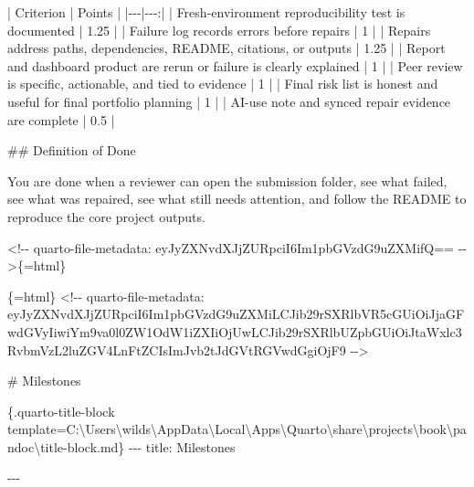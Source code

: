 \documentclass[
  letterpaper,
  DIV=11,
  numbers=noendperiod,
  oneside]{scrreprt}
\newenvironment{Shaded}{\begin{snugshade}}{\end{snugshade}}
\newcommand{\FunctionTok}[1]{\textcolor[rgb]{0.28,0.35,0.67}{#1}}
\newcommand{\InformationTok}[1]{\textcolor[rgb]{0.37,0.37,0.37}{#1}}
\newcommand{\NormalTok}[1]{\textcolor[rgb]{0.00,0.23,0.31}{#1}}
\newcommand{\PreprocessorTok}[1]{\textcolor[rgb]{0.68,0.00,0.00}{#1}}
\begin{document}
\begin{Shaded}
\begin{Highlighting}[numbers=left,,]
\PreprocessorTok{|}\NormalTok{ Criterion }\PreprocessorTok{|}\NormalTok{ Points }\PreprocessorTok{|}
\PreprocessorTok{|{-}{-}{-}|{-}{-}{-}:|}
\PreprocessorTok{|}\NormalTok{ Fresh{-}environment reproducibility test is documented }\PreprocessorTok{|}\NormalTok{ 1.25 }\PreprocessorTok{|}
\PreprocessorTok{|}\NormalTok{ Failure log records errors before repairs }\PreprocessorTok{|}\NormalTok{ 1 }\PreprocessorTok{|}
\PreprocessorTok{|}\NormalTok{ Repairs address paths, dependencies, README, citations, or outputs }\PreprocessorTok{|}\NormalTok{ 1.25 }\PreprocessorTok{|}
\PreprocessorTok{|}\NormalTok{ Report and dashboard product are rerun or failure is clearly explained }\PreprocessorTok{|}\NormalTok{ 1 }\PreprocessorTok{|}
\PreprocessorTok{|}\NormalTok{ Peer review is specific, actionable, and tied to evidence }\PreprocessorTok{|}\NormalTok{ 1 }\PreprocessorTok{|}
\PreprocessorTok{|}\NormalTok{ Final risk list is honest and useful for final portfolio planning }\PreprocessorTok{|}\NormalTok{ 1 }\PreprocessorTok{|}
\PreprocessorTok{|}\NormalTok{ AI{-}use note and synced repair evidence are complete }\PreprocessorTok{|}\NormalTok{ 0.5 }\PreprocessorTok{|}

\FunctionTok{\#\# Definition of Done}

\NormalTok{You are done when a reviewer can open the submission folder, see what failed, see what was repaired, see what still needs attention, and follow the README to reproduce the core project outputs.}


\InformationTok{\textasciigrave{}\textless{}!{-}{-} quarto{-}file{-}metadata: eyJyZXNvdXJjZURpciI6Im1pbGVzdG9uZXMifQ== {-}{-}\textgreater{}\textasciigrave{}}\NormalTok{\{=html\}}

\InformationTok{\textasciigrave{}\textasciigrave{}\textasciigrave{}\{=html\}}
\InformationTok{\textless{}!{-}{-} quarto{-}file{-}metadata: eyJyZXNvdXJjZURpciI6Im1pbGVzdG9uZXMiLCJib29rSXRlbVR5cGUiOiJjaGFwdGVyIiwiYm9va0l0ZW1OdW1iZXIiOjUwLCJib29rSXRlbUZpbGUiOiJtaWxlc3RvbmVzL2luZGV4LnFtZCIsImJvb2tJdGVtRGVwdGgiOjF9 {-}{-}\textgreater{}}
\InformationTok{\textasciigrave{}\textasciigrave{}\textasciigrave{}}

\FunctionTok{\# Milestones }

\InformationTok{\textasciigrave{}\textasciigrave{}\textasciigrave{}\textasciigrave{}\textasciigrave{}\textasciigrave{}\textasciigrave{}\{.quarto{-}title{-}block template=\textquotesingle{}C:\textbackslash{}Users\textbackslash{}wilds\textbackslash{}AppData\textbackslash{}Local\textbackslash{}Apps\textbackslash{}Quarto\textbackslash{}share\textbackslash{}projects\textbackslash{}book\textbackslash{}pandoc\textbackslash{}title{-}block.md\textquotesingle{}\}}
\InformationTok{{-}{-}{-}}
\InformationTok{title: Milestones}

\InformationTok{{-}{-}{-}}
\end{Highlighting}
\end{Shaded}
\end{document}
